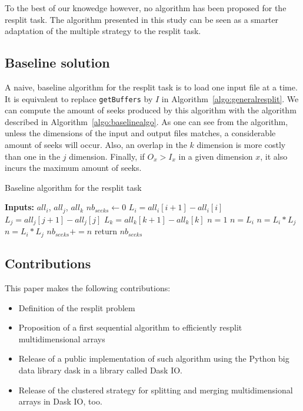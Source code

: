 \documentclass[conference]{IEEEtran}
\begin{document}
To the best of our knowedge however, no algorithm has been proposed for the
resplit task. The algorithm presented in this study can be seen as a smarter
adaptation of the multiple strategy to the resplit task.

\subsection{Baseline solution}
A naive, baseline algorithm for the resplit task is to load one input file at a
time. It is equivalent to replace \texttt{getBuffers} by $I$ in
Algorithm~\ref{algo:generalresplit}. We can compute the amount of seeks produced
by this algorithm with the algorithm described in Algorithm~\ref{algo:baselinealgo}.
As one can see from the algorithm, unless the dimensions of the input and output
files matches, a considerable amount of seeks will occur. Also, an overlap in the
$k$ dimension is more costly than one in the $j$ dimension. Finally, if
$O_x>I_x$ in a given dimension $x$, it also incurs the maximum amount of seeks.

\begin{algorithm}
  \caption{Baseline algorithm for the resplit task}
  \label{algo:baselinealgo}
  \begin{algorithmic}
    \STATE \textbf{Inputs:} $all_i$, $all_j$, $all_k$
    \STATE $nb_{seeks} \leftarrow 0$
          \STATE $L_i = all_i[i+1] - all_i[i]$
          \STATE $L_j = all_j[j+1] - all_j[j]$
          \STATE $L_k = all_k[k+1] - all_k[k]$
                \STATE $n = 1$
              \ELSE
                \STATE $n = L_i$
              \ENDIF
            \ELSE
              \STATE $n = L_i*L_j$
            \ENDIF
          \ELSE
            \STATE $n = L_i*L_j$
          \ENDIF
          \STATE $nb_{seeks} += n$
        \ENDFOR
      \ENDFOR
    \ENDFOR
    \STATE return $nb_{seeks}$
  \end{algorithmic}
\end{algorithm}

\subsection{Contributions}
This paper makes the following contributions:
\begin{itemize}
  \item Definition of the resplit problem
  \item Proposition of a first sequential algorithm to efficiently resplit
  multidimensional arrays
  \item Release of a public implementation of such algorithm using the Python
  big data library dask in a library called Dask IO.
  \item Release of the clustered strategy for splitting and merging
  multidimensional arrays in Dask IO, too.
\end{itemize}
\end{document}
